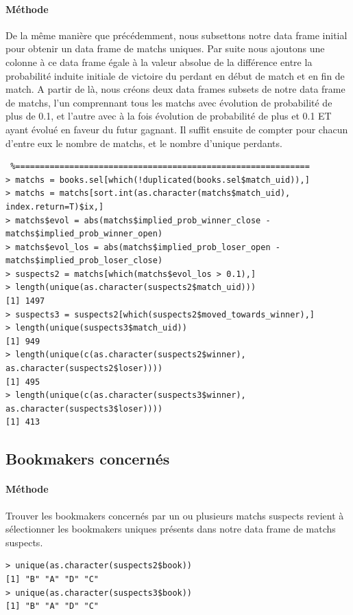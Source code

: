 \documentclass{report}
\begin{document}
\begin{appendices}
\paragraph{Méthode}
De la même manière que précédemment, nous subsettons notre data frame initial pour obtenir un data frame de matchs uniques. Par suite nous ajoutons une colonne à ce data frame égale à la valeur absolue de la différence entre la probabilité induite initiale de victoire du perdant en début de match et en fin de match. A partir de là, nous créons deux data frames subsets de notre data frame de matchs, l'un comprennant tous les matchs avec évolution de probabilité de plus de 0.1, et l'autre avec à la fois évolution de probabilité de plus et 0.1 ET ayant évolué en faveur du futur gagnant. Il suffit ensuite de compter pour chacun d'entre eux le nombre de matchs, et le nombre d'unique perdants.
\begin{lstlisting} %============================================================
> matchs = books.sel[which(!duplicated(books.sel$match_uid)),]
> matchs = matchs[sort.int(as.character(matchs$match_uid), index.return=T)$ix,]
> matchs$evol = abs(matchs$implied_prob_winner_close -
matchs$implied_prob_winner_open)
> matchs$evol_los = abs(matchs$implied_prob_loser_open - matchs$implied_prob_loser_close)
> suspects2 = matchs[which(matchs$evol_los > 0.1),]
> length(unique(as.character(suspects2$match_uid)))
[1] 1497
> suspects3 = suspects2[which(suspects2$moved_towards_winner),]
> length(unique(suspects3$match_uid))
[1] 949
> length(unique(c(as.character(suspects2$winner), as.character(suspects2$loser))))
[1] 495
> length(unique(c(as.character(suspects3$winner), as.character(suspects3$loser))))
[1] 413
\end{lstlisting} %

\subsection{Bookmakers concernés} %
\paragraph{Méthode}
Trouver les bookmakers concernés par un ou plusieurs matchs suspects revient à sélectionner les bookmakers uniques présents dans notre data frame de matchs suspects.
\begin{lstlisting}
> unique(as.character(suspects2$book))
[1] "B" "A" "D" "C"
> unique(as.character(suspects3$book))
[1] "B" "A" "D" "C"
\end{lstlisting} %


\end{appendices}
\end{document}
